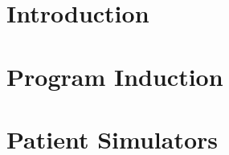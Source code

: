 


\coverpage{\TITLE}{\SUBTITLE}{\AUTHOR}{\DATE}{\SUBJECT}

\newpage



\tableofcontents

\listoffigures

\listoftables



\part{Introduction}
\label{part:intro}

\newpage


\newpage


\newpage


\part{Program Induction}
\label{part:proginduction}

\newpage


\newpage


\newpage


\newpage


\newpage


\newpage


\part{Patient Simulators}
\label{part:simulators}

